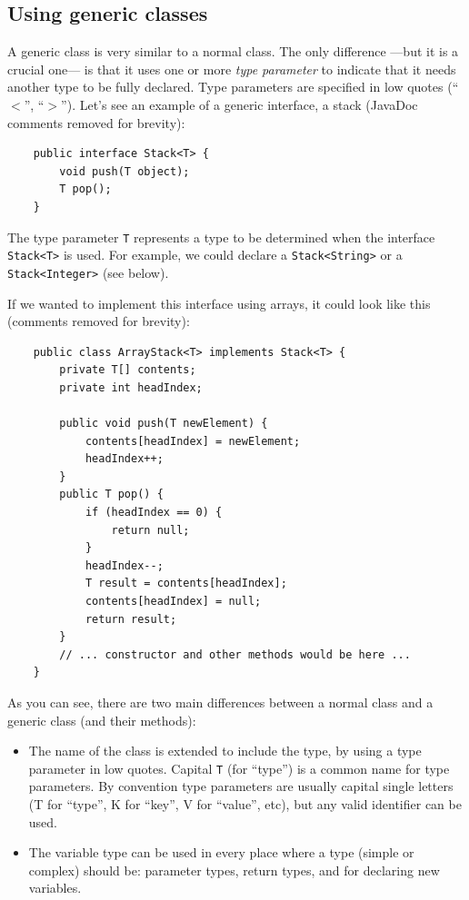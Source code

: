 \subsection{Using generic classes}
\label{sec:using-gener-class}

A generic class is very similar to a normal class. The only
difference ---but it is a crucial one--- is that it uses one or more
\emph{type parameter} to indicate that it needs another type to be
fully declared. Type parameters
are specified in low quotes (``$<$'', ``$>$''). Let's see an
example of a generic interface, a stack (JavaDoc comments removed for
brevity): 

\begin{verbatim}
    public interface Stack<T> {
        void push(T object);
        T pop();
    }
\end{verbatim}

The type parameter \verb+T+ represents a type to be determined when the
interface \verb+Stack<T>+ is used. For example, we could declare a
\verb+Stack<String>+ or a \verb+Stack<Integer>+ (see below). 

If we wanted to implement this interface using arrays, it could look
like this (comments removed for brevity): 

\begin{verbatim}
    public class ArrayStack<T> implements Stack<T> {
        private T[] contents;
        private int headIndex; 

        public void push(T newElement) {
            contents[headIndex] = newElement;
            headIndex++;
        }
        public T pop() {
            if (headIndex == 0) {
                return null;
            }
            headIndex--;
            T result = contents[headIndex];
            contents[headIndex] = null;
            return result;
        }
        // ... constructor and other methods would be here ...
    }
\end{verbatim}

As you can see, there are two main differences between a normal class
and a generic class (and their methods): 

\begin{itemize}
\item The name of the class is extended to include the type, by using
  a type parameter in low quotes. Capital \verb+T+ (for ``type'') is a common
  name for type parameters. By convention type parameters are
  usually capital single letters (T for ``type'', K for ``key'', 
  V for ``value'', etc), but any valid identifier can be
  used.
\item The variable type can be used in every place where a type
  (simple or complex) should be: parameter types, return types, and
  for declaring new variables. 
\end{itemize}

